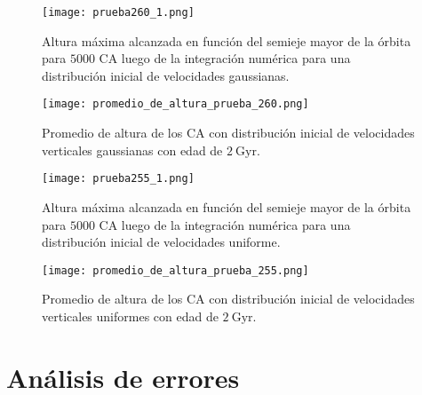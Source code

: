 \documentclass[baaa]{baaa}
\begin{document}
\begin{figure}[!h]
    \centering
    \begin{minipage}{\columnwidth}
        \centering
        \texttt{[image: prueba260\_1.png]}
        \caption{Altura máxima alcanzada en función del semieje mayor de la órbita para $5000$ CA luego de la integración numérica para una distribución inicial de velocidades gaussianas.}
        \label{fig:prueba260}
    \end{minipage}
    
    \vspace{1em} %
    
    \begin{minipage}{\columnwidth}
        \centering
        \texttt{[image: promedio\_de\_altura\_prueba\_260.png]}
        \caption{Promedio de altura de los CA con distribución inicial de velocidades verticales gaussianas con edad de $2~\mathrm{Gyr}$.}
        \label{fig:promedio_de_altura_260}
    \end{minipage}
\end{figure}



\begin{figure}[!h]
    \centering
    \begin{minipage}{\columnwidth}
        \centering
        \texttt{[image: prueba255\_1.png]}
        \caption{Altura máxima alcanzada en función del semieje mayor de la órbita para $5000$ CA luego de la integración numérica para una distribución inicial de velocidades uniforme.}
        \label{fig:prueba255}
    \end{minipage}
    
    \vspace{1em} %
    
    \begin{minipage}{\columnwidth}
        \centering
        \texttt{[image: promedio\_de\_altura\_prueba\_255.png]}
        \caption{Promedio de altura de los CA con distribución inicial de velocidades verticales uniformes con edad de $2~\mathrm{Gyr}$.}
        \label{fig:promedio_de_altura_255}
    \end{minipage}
\end{figure}

\section{Análisis de errores}\label{Errores}
\end{document}
